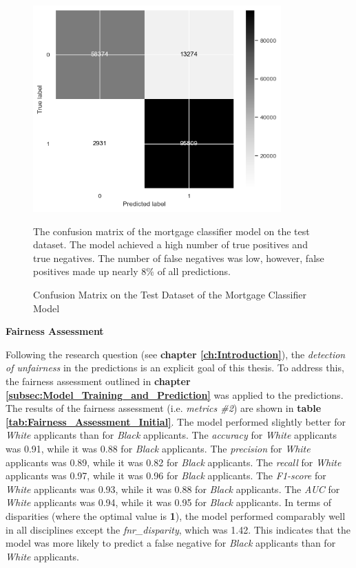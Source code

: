 \begin{figure}
    \centering
    \includegraphics[width=0.85\textwidth]{images/Model_Training/Initial_Confusion_Matrix.png}
    \caption{Confusion Matrix on the Test Dataset of the Mortgage Classifier Model}
    \medskip
    \small
    The confusion matrix of the mortgage classifier model on the test dataset. The model achieved a high number of true positives and true negatives. The number of false negatives was low, however, false positives made up nearly 8\% of all predictions.
    \label{fig:Model_Confusion_Matrix}
\end{figure}

\textbf{Fairness Assessment}

Following the research question (see \textbf{chapter \ref{ch:Introduction}}), the \textit{detection of unfairness} in the predictions is an explicit goal of this thesis. To address this, the fairness assessment outlined in \textbf{chapter \ref{subsec:Model_Training_and_Prediction}} was applied to the predictions. The results of the fairness assessment (i.e. \textit{metrics \#2}) are shown in \textbf{table \ref{tab:Fairness_Assessment_Initial}}. 
The model performed slightly better for \textit{White} applicants than for \textit{Black} applicants. The \textit{accuracy} for \textit{White} applicants was 0.91, while it was 0.88 for \textit{Black} applicants. The \textit{precision} for \textit{White} applicants was 0.89, while it was 0.82 for \textit{Black} applicants. The \textit{recall} for \textit{White} applicants was 0.97, while it was 0.96 for \textit{Black} applicants. 
The \textit{F1-score} for \textit{White} applicants was 0.93, while it was 0.88 for \textit{Black} applicants. The \textit{AUC} for \textit{White} applicants was 0.94, while it was 0.95 for \textit{Black} applicants. 
In terms of disparities (where the optimal value is \textbf{1}), the model performed comparably well in all disciplines except the \textit{fnr\_disparity}, which was 1.42. This indicates that the model was more likely to predict a false negative for \textit{Black} applicants than for \textit{White} applicants.

